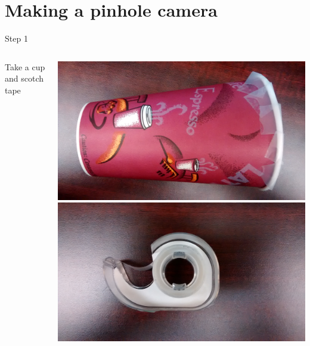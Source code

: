 \section{Making a pinhole camera}
\begin{frame}{Step 1}
  \begin{columns}
    \begin{column}{0.4\textwidth}
      Take a cup and scotch tape
    \end{column}
    \begin{column}{0.6\textwidth}
      \includegraphics[width=\textwidth]{media/cup.jpg}\\
      \includegraphics[width=\textwidth]{media/tape.jpg}
    \end{column}
  \end{columns}
\end{frame}


